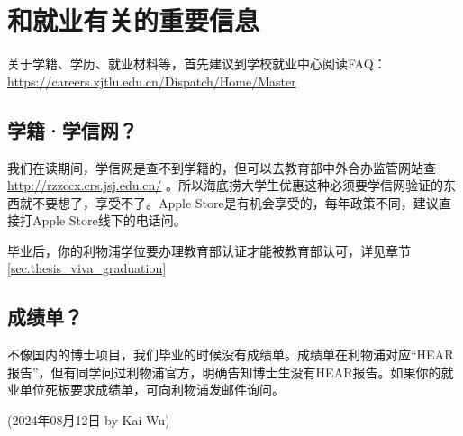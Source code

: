 \section{和就业有关的重要信息}

关于学籍、学历、就业材料等，首先建议到学校就业中心阅读FAQ：\url{https://careers.xjtlu.edu.cn/Dispatch/Home/Master}

\subsection{学籍·学信网？}

我们在读期间，学信网是查不到学籍的，但可以去教育部中外合办监管网站查 \url{http://rzzccx.crs.jsj.edu.cn/} 。所以海底捞大学生优惠这种必须要学信网验证的东西就不要想了，享受不了。Apple Store是有机会享受的，每年政策不同，建议直接打Apple Store线下的电话问。

毕业后，你的利物浦学位要办理教育部认证才能被教育部认可，详见章节 \ref{sec.thesis_viva_graduation} 

\subsection{成绩单？}

不像国内的博士项目，我们毕业的时候没有成绩单。成绩单在利物浦对应“HEAR报告”，但有同学问过利物浦官方，明确告知博士生没有HEAR报告。如果你的就业单位死板要求成绩单，可向利物浦发邮件询问。

\begin{flushright}
    (2024年08月12日 by Kai Wu)
\end{flushright}







% 
